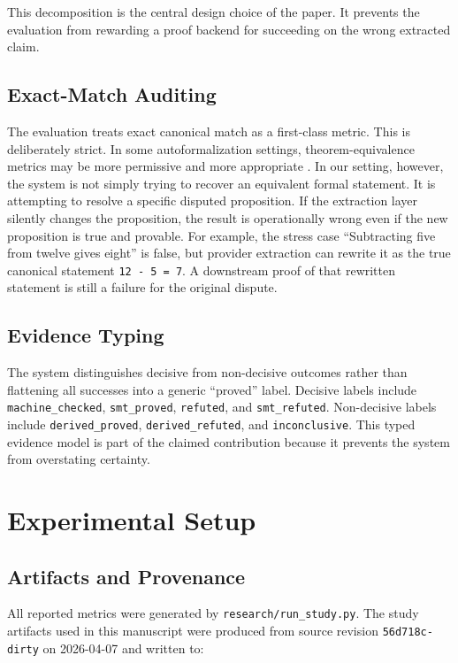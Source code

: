 \documentclass[11pt]{article}
\begin{document}
This decomposition is the central design choice of the paper. It prevents the
evaluation from rewarding a proof backend for succeeding on the wrong extracted
claim.

\subsection{Exact-Match Auditing}

The evaluation treats exact canonical match as a first-class metric. This is
deliberately strict. In some autoformalization settings, theorem-equivalence
metrics may be more permissive and more appropriate \citep{poiroux2025reliable}.
In our setting, however, the system is not simply trying to recover an
equivalent formal statement. It is attempting to resolve a specific disputed
proposition. If the extraction layer silently changes the proposition, the
result is operationally wrong even if the new proposition is true and provable.
For example, the stress case ``Subtracting five from twelve gives eight'' is
false, but provider extraction can rewrite it as the true canonical statement
\texttt{12 - 5 = 7}. A downstream proof of that rewritten statement is still a
failure for the original dispute.

\subsection{Evidence Typing}

The system distinguishes decisive from non-decisive outcomes rather than
flattening all successes into a generic ``proved'' label. Decisive labels
include \texttt{machine\_checked}, \texttt{smt\_proved}, \texttt{refuted}, and
\texttt{smt\_refuted}. Non-decisive labels include \texttt{derived\_proved},
\texttt{derived\_refuted}, and \texttt{inconclusive}. This typed evidence model
is part of the claimed contribution because it prevents the system from
overstating certainty.

\section{Experimental Setup}

\subsection{Artifacts and Provenance}

All reported metrics were generated by
\nolinkurl{research/run_study.py}. The study artifacts used in this manuscript
were produced from source revision \texttt{56d718c-dirty} on 2026-04-07 and
written to:
\end{document}
